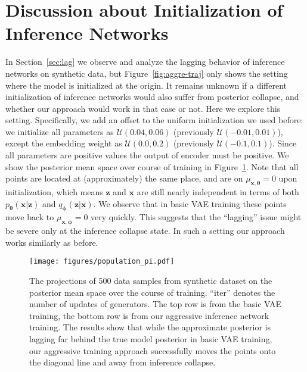 \documentclass{article} \usepackage{iclr2019_conference,times}
\def\rvx{{\mathbf{x}}}
\def\rvz{{\mathbf{z}}}
\def\vtheta{{\bm{\theta}}}
\def\vphi{{\bm{\phi}}}
\def\gU{{\mathcal{U}}}
\newcommand{\qzx}{q_{\vphi}(\rvz|\rvx)}
\newcommand{\pxz}{p_{\vtheta}(\rvx|\rvz)}
\newcommand{\z}{\rvz}
\newcommand{\x}{\rvx}
\begin{document}
\section{Discussion about Initialization of Inference Networks}\label{apdix:enc-init}
In Section~\ref{sec:lag} we observe and analyze the lagging behavior of inference networks on synthetic data, but Figure~\ref{fig:aggre-traj} only shows the setting where the model is initialized at the origin. It remains unknown if a different initialization of inference networks would also suffer from posterior collapse, and whether our approach would work in that case or not. Here we explore this setting. Specifically, we add an offset to the uniform initialization we used before: we initialize all parameters as $\gU(0.04, 0.06)$ (previously $\gU(-0.01, 0.01)$), except the embedding weight as $\gU(0.0, 0.2)$ (previously $\gU(-0.1, 0.1)$). Since all parameters are positive values the output of encoder must be positive. We show the posterior mean space over course of training in Figure~\ref{fig:apdix-aggre-traj}. Note that all points are located at (approximately) the same place, and are on $\mu_{\x, \vtheta} = 0$ upon initialization, which means $\z$ and $\x$ are still nearly independent in terms of both $\pxz$ and $\qzx$. We observe that in basic VAE training these points move back to $\mu_{\x, \vphi} = 0$ very quickly. This suggests that the ``lagging'' issue might be severe only at the inference collapse state. In such a setting our approach works similarly as before.
 
\begin{figure}[h]
\centering
	 \texttt{[image: figures/population\_pi.pdf]}
	 \vspace{-15pt}
	 \caption{The projections of 500 data samples from synthetic dataset on the posterior mean space over the course of training. ``iter'' denotes the number of updates of generators. The top row is from the basic VAE training, the bottom row is from our aggressive inference network training. The results show that while the approximate posterior is lagging far behind the true model posterior in basic VAE training, our aggressive training approach successfully moves the points onto the diagonal line and away from inference collapse.}
	\label{fig:apdix-aggre-traj}
	\vspace{-10pt}
\end{figure}
\end{document}
